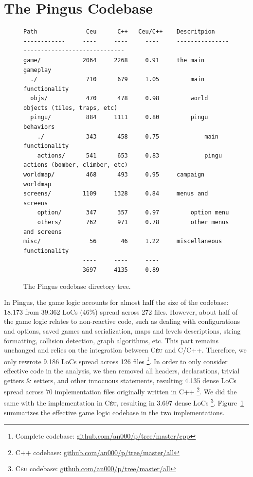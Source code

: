 \documentclass{vgtc}                          %
\newcommand{\CEU}{\textsc{C\'{e}u}\xspace}
\begin{document}
\section{The Pingus Codebase}
\label{sec.codebase}

\begin{figure}[t]
\begin{verbatim}
Path              Ceu      C++   Ceu/C++    Descritpion
------------     ----     ----     ----     --------------------------------------------
game/            2064     2268     0.91     the main gameplay
  ./              710      679     1.05         main functionality
  objs/           470      478     0.98         world objects (tiles, traps, etc)
  pingu/          884     1111     0.80         pingu behaviors
    ./            343      458     0.75             main functionality
    actions/      541      653     0.83             pingu actions (bomber, climber, etc)
worldmap/         468      493     0.95     campaign worldmap
screens/         1109     1328     0.84     menus and screens
    option/       347      357     0.97         option menu
    others/       762      971     0.78         other menus and screens
misc/              56       46     1.22     miscellaneous functionality
                 ----     ----     ----
                 3697     4135     0.89
\end{verbatim}
\caption{The Pingus codebase directory tree.
\label{tab.tree}
}
\end{figure}

In Pingus, the game logic accounts for almost half the size of the codebase:
18.173 from 39.362 LoCs (46\%) spread across 272 files.
%
However, about half of the game logic relates to non-reactive code, such as
dealing with configurations and options, saved games and serialization, maps
and levels descriptions, string formatting, collision detection, graph
algorithms, etc.
This part remains unchanged and relies on the integration between \CEU and
C/C++.
%
Therefore, we only rewrote 9.186 LoCs spread across 126 files%
\footnote{Complete codebase: \url{github.com/an000/p/tree/master/cpp}}.
%
In order to only consider effective code in the analysis, we then removed all
headers, declarations, trivial getters \& setters, and other innocuous
statements, resulting 4.135 dense LoCs spread across 70 implementation files
originally written in C++%
\footnote{C++ codebase: \url{github.com/an000/p/tree/master/all}}.
We did the same with the implementation in \CEU, resulting in 3.697 dense LoCs%
\footnote{\CEU codebase: \url{github.com/an000/p/tree/master/all}}.
%
Figure~\ref{tab.tree} summarizes the effective game logic codebase in the two
implementations.
\end{document}
